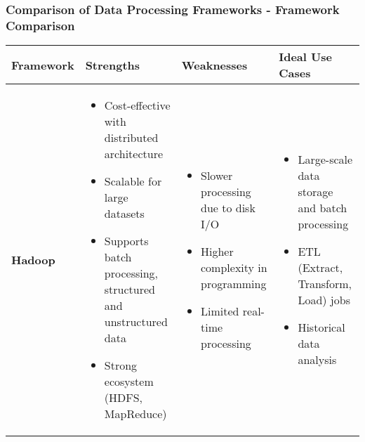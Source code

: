 \documentclass[aspectratio=169]{beamer}
\begin{document}
\begin{frame}[fragile]
    \frametitle{Comparison of Data Processing Frameworks - Framework Comparison}
    \begin{table}[h]
        \centering
        \begin{tabular}{|l|l|l|l|}
            \hline
            \textbf{Framework} & \textbf{Strengths} & \textbf{Weaknesses} & \textbf{Ideal Use Cases} \\ \hline
            \textbf{Hadoop} & 
            \begin{itemize}
                \item Cost-effective with distributed architecture
                \item Scalable for large datasets
                \item Supports batch processing, structured and unstructured data
                \item Strong ecosystem (HDFS, MapReduce)
            \end{itemize} & 
            \begin{itemize}
                \item Slower processing due to disk I/O
                \item Higher complexity in programming
                \item Limited real-time processing
            \end{itemize} &
            \begin{itemize}
                \item Large-scale data storage and batch processing
                \item ETL (Extract, Transform, Load) jobs
                \item Historical data analysis
            \end{itemize} \\  \hline
            

\end{tabular}
\end{table}
\end{frame}
\end{document}

